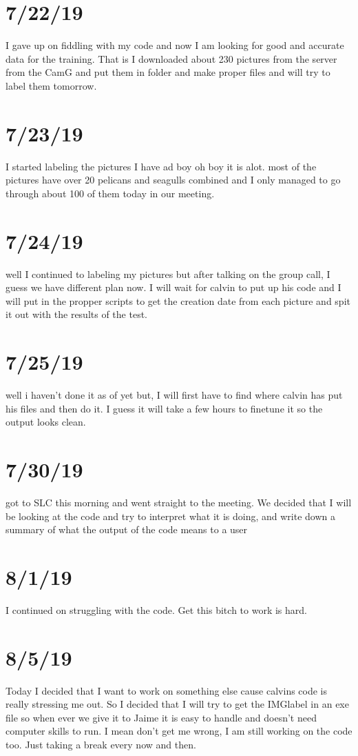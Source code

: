 \documentclass{article}
\begin{document}
\section{7/22/19}
I gave up on fiddling with my code and now I am looking for good and accurate data for the training. That is I downloaded about 230 pictures from the server from the CamG and put them in folder and make proper files and will try to label them tomorrow.

\section{7/23/19}
I started labeling the pictures I have ad boy oh boy it is alot. most of the pictures have over 20 pelicans and seagulls combined and I only managed to go through about 100 of them today in our meeting.

\section{7/24/19}
well I continued to labeling my pictures but after talking on the group call, I guess we have different plan now. I will wait for calvin to put up his code and I will put in the propper scripts to get the creation date from each picture and spit it out with the results of the test. 

\section{7/25/19}
well i haven't done it as of yet but, I will first have to find where calvin has put his files and then do it. I guess it will take a few hours to finetune it so the output looks clean.

\section{7/30/19}
got to SLC this morning and went straight to the meeting. We decided that I will be looking at the code and try to interpret what it is doing, and write down a summary of what the output of the code means to a user

\section{8/1/19}
I continued on struggling with the code. Get this bitch to work is hard.

\section{8/5/19}
Today I decided that I want to work on something else cause calvins code is really stressing me out. So I decided that I will try to get the IMGlabel in an exe file so when ever we give it to Jaime it is easy to handle and doesn’t need computer skills to run. I mean don’t get me wrong, I am still working on the code too. Just taking a break every now and then.
\end{document}
